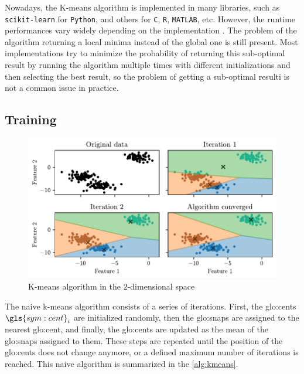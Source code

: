 Nowadays, the K-means algorithm is implemented in many libraries, such as \texttt{scikit-learn} for \texttt{Python}, and others for \texttt{C}, \texttt{R}, \texttt{MATLAB}, etc. However, the runtime performances vary widely depending on the implementation \cite{Kmeans-performances-Kriegel2017}. The problem of the algorithm returning a local minima instead of the global one is still present. Most implementations try to minimize the probability of returning this sub-optimal result by running the algorithm multiple times with different initializations and then selecting the best result, so the problem of getting a sub-optimal resulti is not a common issue in practice.

\subsection{Training}

\begin{figure}[htbp]
  \centering
  \includegraphics[width=\textwidth]{images/Kmeans_vornoi.pdf}
  \caption{K-means algorithm in the $2$-dimensional space}
  \label{fig:kmeans_vornoi}
\end{figure}

 The naive k-means algorithm consists of a series of iterations. First, the {\gls{glo:cent}}s $\gls{sym:cent}_i$ are initialized randomly, then the {\gls{glo:snap}}s are assigned to the nearest {\gls{glo:cent}}, and finally, the {\gls{glo:cent}}s are updated as the mean of the {\gls{glo:snap}}s assigned to them. These steps are repeated until the position of the {\gls{glo:cent}}s does not change anymore, or a defined maximum number of iterations is reached. This naive algorithm is summarized in the \autoref{alg:kmeans}.

